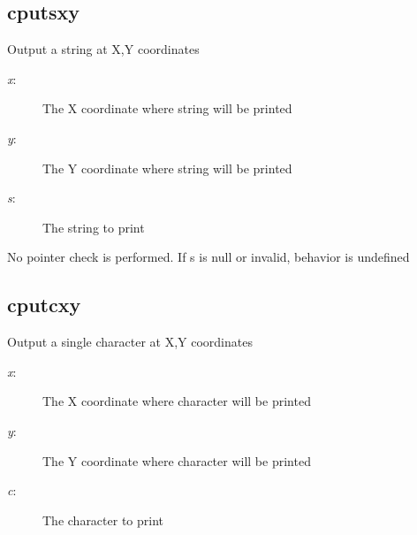 \subsection{cputsxy}
\begin{description}[leftmargin=2cm,style=nextline]
\item [Description:] {Output a string at X,Y coordinates}
\item [Syntax:] 
\item [Parameters:]
\begin{description}\item[]
\item [{\em x}:] {The X coordinate where string will be printed}
\item [{\em y}:] {The Y coordinate where string will be printed}
\item [{\em s}:] {The string to print}
\end{description}
\item [Notes:] {No pointer check is performed.  If s is null or invalid, behavior is undefined }
\end{description}

\subsection{cputcxy}
\begin{description}[leftmargin=2cm,style=nextline]
\item [Description:] {Output a single character at X,Y coordinates}
\item [Syntax:] 
\item [Parameters:]
\begin{description}\item[]
\item [{\em x}:] {The X coordinate where character will be printed}
\item [{\em y}:] {The Y coordinate where character will be printed}
\item [{\em c}:] {The character to print}
\end{description}
\end{description}

